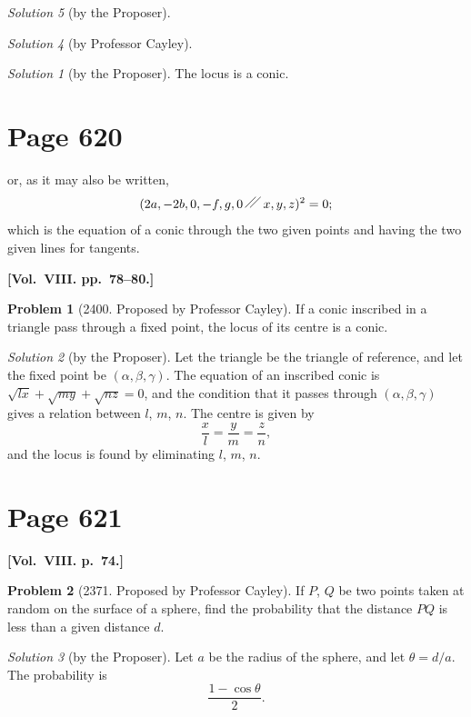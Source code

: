 \documentclass[12pt,a4paper]{article}
\theoremstyle{plain}
\theoremstyle{definition}
\newtheorem{problem}{Problem}
\theoremstyle{remark}
\newtheorem*{solution}{Solution}
\begin{document}
\begin{solution}[by the Proposer]
\begin{solution}[by Professor Cayley]
\begin{solution}[by the Proposer]
The locus is a conic.
\end{solution}

\section*{Page 620}
\setcounter{page}{620}

or, as it may also be written,
\[
(2a, -2b, 0, -f, g, 0 \,\raisebox{0.5ex}{\ensuremath{\diagup\kern-0.5em\diagup}}\, x, y, z)^2 = 0;
\]
which is the equation of a conic through the two given points and having the two given lines for tangents.

\medskip\noindent\textbf{[Vol.~VIII. pp.~78--80.]}

\begin{problem}[2400. Proposed by Professor Cayley]
If a conic inscribed in a triangle pass through a fixed point, the locus of its centre is a conic.
\end{problem}

\begin{solution}[by the Proposer]
Let the triangle be the triangle of reference, and let the fixed point be $(\alpha, \beta, \gamma)$. The equation of an inscribed conic is $\sqrt{lx} + \sqrt{my} + \sqrt{nz} = 0$, and the condition that it passes through $(\alpha, \beta, \gamma)$ gives a relation between $l$, $m$, $n$. The centre is given by
\[
\frac{x}{l} = \frac{y}{m} = \frac{z}{n},
\]
and the locus is found by eliminating $l$, $m$, $n$.
\end{solution}

\section*{Page 621}
\setcounter{page}{621}

\medskip\noindent\textbf{[Vol.~VIII. p.~74.]}

\begin{problem}[2371. Proposed by Professor Cayley]
If $P$, $Q$ be two points taken at random on the surface of a sphere, find the probability that the distance $PQ$ is less than a given distance $d$.
\end{problem}

\begin{solution}[by the Proposer]
Let $a$ be the radius of the sphere, and let $\theta = d/a$. The probability is
\[
\frac{1 - \cos\theta}{2}.
\]
\end{solution}


\end{solution}
\end{solution}
\end{document}
